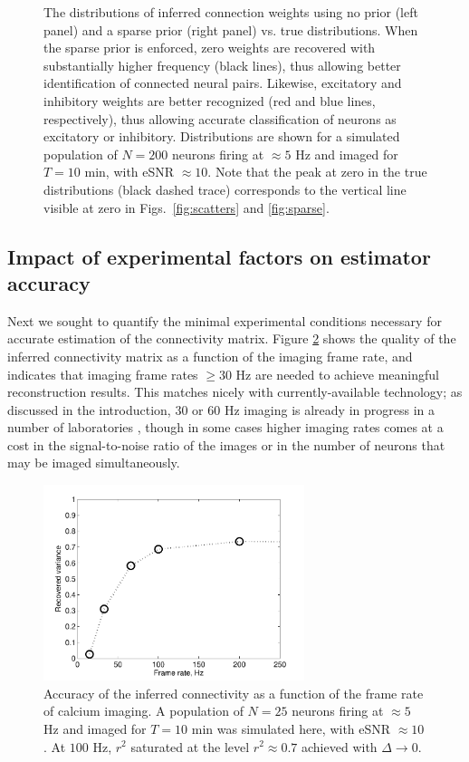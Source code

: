 \documentclass[aoas,preprint]{imsart}
\begin{document}
\begin{figure}[t!]
\begin{minipage}[c]{0.45\hsize}
\end{minipage}
\caption{The distributions of inferred connection weights using no
prior (left panel) and a sparse prior (right panel) vs. true
distributions. When the sparse prior is enforced, zero weights are
recovered with substantially higher frequency (black lines), thus
allowing better identification of connected neural pairs. Likewise,
excitatory and inhibitory weights are better recognized (red and blue
lines, respectively), thus allowing accurate classification of neurons
as excitatory or inhibitory. Distributions are shown for a simulated
population of $N=200$ neurons firing at $\approx 5$ Hz and imaged for
$T=10$ min, with eSNR $\approx 10$.  Note that the peak at zero in the
true distributions (black dashed trace) corresponds to the vertical
line visible at zero in Figs.~\ref{fig:scatters} and
\ref{fig:sparse}.}
\label{fig:distros}
\end{figure}


\subsection{Impact of experimental factors on estimator accuracy}

Next we sought to quantify the minimal experimental conditions
necessary for accurate estimation of the connectivity matrix.  Figure
\ref{fig:recvar} shows the quality of the inferred connectivity matrix
as a function of the imaging frame rate, and indicates that imaging
frame rates $\geq 30$ Hz are needed to achieve meaningful
reconstruction results.  This matches nicely with currently-available
technology; as discussed in the introduction, $30$ or $60$ Hz imaging
is already in progress in a number of laboratories
\cite{NguyenParker01,Iyer06,SalomeBourdieu06,ReddySaggau08}, though in
some cases higher imaging rates comes at a cost in the signal-to-noise
ratio of the images or in the number of neurons that may be imaged
simultaneously.


\begin{figure}[t!]
\centering \includegraphics[width=3in]{../figs/FigureA5_recvar}
\caption{Accuracy of the inferred connectivity as a function of the
frame rate of calcium imaging.  A population of $N=25$ neurons firing
at $\approx 5$ Hz and imaged for $T=10$ min was simulated here, with
eSNR $\approx 10$.  At $100$ Hz, $r^2$ saturated at the level
$r^2\approx 0.7$ achieved with $\Delta \rightarrow 0$.}
\label{fig:recvar}
\end{figure}
\end{document}
